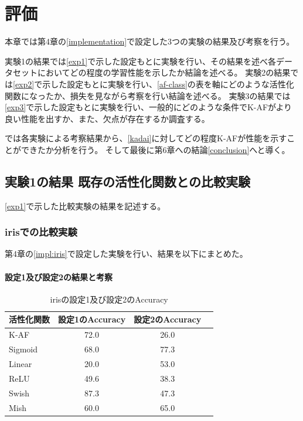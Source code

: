 \chapter{評価}
\label{evaluation}

本章では第4章の\ref{implementation}で設定した3つの実験の結果及び考察を行う。

実験1の結果\label{evo1}では\ref{exp1}で示した設定もとに実験を行い、その結果を述べ各データセットにおいてどの程度の学習性能を示したか結論を述べる。
実験2の結果\label{evo2}では\ref{exp2}で示した設定もとに実験を行い、\ref{af-class}の表を軸にどのような活性化関数になったか、損失を見ながら考察を行い結論を述べる。
実験3の結果\label{evo3}では\ref{exp3}で示した設定もとに実験を行い、一般的にどのような条件でK-AFがより良い性能を出すか、また、欠点が存在するか調査する。

\label{result}では各実験による考察結果から、\ref{kadai}に対してどの程度K-AFが性能を示すことができたか分析を行う。
そして最後に第6章への結論\ref{conclusion}へと導く。


\section{実験1の結果 既存の活性化関数との比較実験}
\label{evo1}
\ref{exp1}で示した比較実験の結果を記述する。

\subsection{irisでの比較実験}
\label{ev:iris}

第4章の\ref{impl:iris}で設定した実験を行い、結果を以下にまとめた。
\subsubsection{設定1及び設定2の結果と考察}


\begin{table}[htbp]
    \begin{center}
        \caption{irisの設定1及び設定2のAccuracy}
        \vspace{2mm} 
        \begin{tabular}{l*{2}{c}r}
            活性化関数  & 設定1のAccuracy &  設定2のAccuracy \\
            \hline
            K-AF            & 72.0 & 26.0 \\
            Sigmoid            & 68.0 & 77.3\\
            Linear            & 20.0 & 53.0\\
            ReLU        &  49.6 &  38.3\\
            Swish           & 87.3 & 47.3 \\
            Mish           & 60.0 & 65.0 \\
    
        \end{tabular}
    \end{center}
\end{table}


